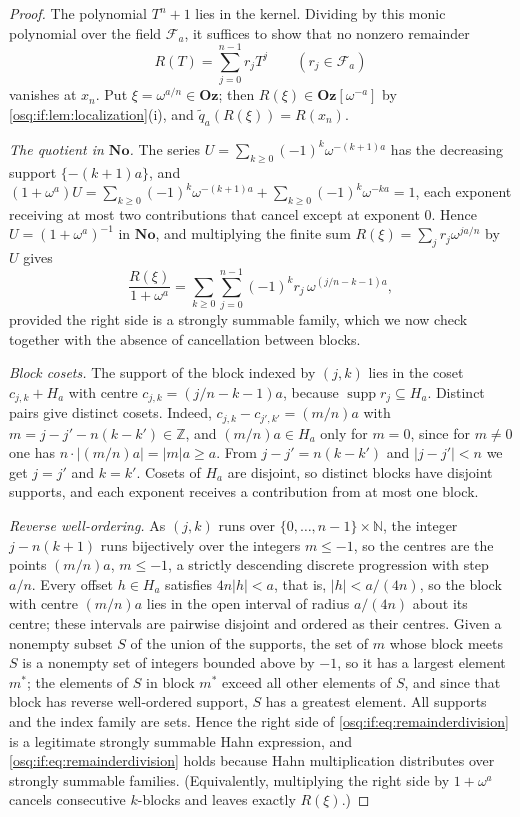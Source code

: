 \documentclass[11pt,letterpaper]{article}
\numberwithin{equation}{section}
\theoremstyle{definition}
\theoremstyle{remark}
\theoremstyle{plain}
\newcommand{\No}{\mathbf{No}}
\newcommand{\Oz}{\mathbf{Oz}}
\newcommand{\Z}{\mathbb Z}
\newcommand{\N}{\mathbb N}
\newcommand{\FF}{\mathscr F}         %
\newcommand{\supp}{\operatorname{supp}}
\begin{document}
\begin{proof}
The polynomial $T^n+1$ lies in the kernel. Dividing by this monic polynomial over the
field $\FF_a$, it suffices to show that no nonzero remainder
\[
 R(T)=\sum_{j=0}^{n-1}r_jT^j\qquad(r_j\in\FF_a)
\]
vanishes at $x_n$. Put $\xi=\omega^{a/n}\in\Oz$; then $R(\xi)\in\Oz[\omega^{-a}]$ by
\cref{osq:if:lem:localization}(i), and $\widetilde q_a(R(\xi))=R(x_n)$.

\emph{The quotient in $\No$.} The series $U=\sum_{k\ge0}(-1)^k\omega^{-(k+1)a}$ has the
decreasing support $\{-(k+1)a\}$, and $(1+\omega^a)U=\sum_{k\ge0}(-1)^k\omega^{-(k+1)a}
+\sum_{k\ge0}(-1)^k\omega^{-ka}=1$, each exponent receiving at most two contributions that
cancel except at exponent $0$. Hence $U=(1+\omega^a)^{-1}$ in $\No$, and multiplying the
finite sum $R(\xi)=\sum_jr_j\omega^{ja/n}$ by $U$ gives
\begin{equation}\label{osq:if:eq:remainderdivision}
 \frac{R(\xi)}{1+\omega^a}=\sum_{k\ge0}\sum_{j=0}^{n-1}(-1)^kr_j\,\omega^{(j/n-k-1)a},
\end{equation}
provided the right side is a strongly summable family, which we now check together with
the absence of cancellation between blocks.

\emph{Block cosets.} The support of the block indexed by $(j,k)$ lies in the coset
$c_{j,k}+H_a$ with centre $c_{j,k}=(j/n-k-1)a$, because $\supp r_j\subseteq H_a$. Distinct
pairs give distinct cosets. Indeed, $c_{j,k}-c_{j',k'}=(m/n)a$ with
$m=j-j'-n(k-k')\in\Z$, and $(m/n)a\in H_a$ only for $m=0$, since for $m\ne0$ one has
$n\cdot|(m/n)a|=|m|a\ge a$. From $j-j'=n(k-k')$ and $|j-j'|<n$ we get $j=j'$ and $k=k'$.
Cosets of $H_a$ are disjoint, so distinct blocks have disjoint supports, and each exponent
receives a contribution from at most one block.

\emph{Reverse well-ordering.} As $(j,k)$ runs over $\{0,\dots,n-1\}\times\N$, the integer
$j-n(k+1)$ runs bijectively over the integers $m\le-1$, so the centres are the points
$(m/n)a$, $m\le-1$, a strictly descending discrete progression with step $a/n$. Every
offset $h\in H_a$ satisfies $4n|h|<a$, that is, $|h|<a/(4n)$, so the block with centre
$(m/n)a$ lies in the open interval of radius $a/(4n)$ about its centre; these intervals are
pairwise disjoint and ordered as their centres. Given a nonempty subset $S$ of the union of
the supports, the set of $m$ whose block meets $S$ is a nonempty set of integers bounded
above by $-1$, so it has a largest element $m^*$; the elements of $S$ in block $m^*$
exceed all other elements of $S$, and since that block has reverse well-ordered support,
$S$ has a greatest element. All supports and the index family are sets. Hence the right
side of \eqref{osq:if:eq:remainderdivision} is a legitimate strongly summable Hahn
expression, and \eqref{osq:if:eq:remainderdivision} holds because Hahn multiplication
distributes over strongly summable families. (Equivalently, multiplying the right side by
$1+\omega^a$ cancels consecutive $k$-blocks and leaves exactly $R(\xi)$.)


\end{proof}
\end{document}
